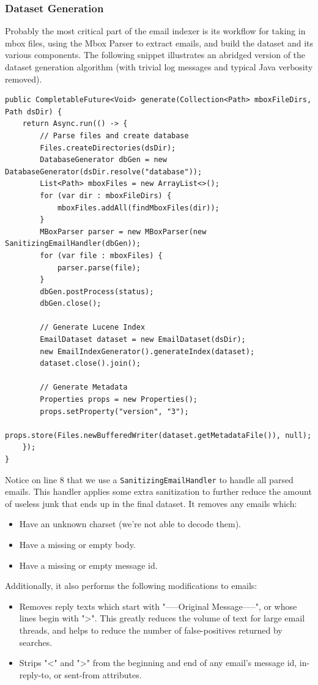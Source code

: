 \documentclass[a4paper, 12pt]{article}
\begin{document}
		\newpage %
		\subsubsection{Dataset Generation}
			Probably the most critical part of the email indexer is its workflow for taking in mbox files, using the Mbox Parser to extract emails, and build the dataset and its various components. The following snippet illustrates an abridged version of the dataset generation algorithm (with trivial log messages and typical Java verbosity removed).
			
			\begin{verbatim}
public CompletableFuture<Void> generate(Collection<Path> mboxFileDirs, Path dsDir) {
	return Async.run(() -> {
		// Parse files and create database
		Files.createDirectories(dsDir);
		DatabaseGenerator dbGen = new DatabaseGenerator(dsDir.resolve("database"));
		List<Path> mboxFiles = new ArrayList<>();
		for (var dir : mboxFileDirs) {
			mboxFiles.addAll(findMboxFiles(dir));
		}
		MBoxParser parser = new MBoxParser(new SanitizingEmailHandler(dbGen));
		for (var file : mboxFiles) {
			parser.parse(file);
		}
		dbGen.postProcess(status);
		dbGen.close();
		
		// Generate Lucene Index
		EmailDataset dataset = new EmailDataset(dsDir);
		new EmailIndexGenerator().generateIndex(dataset);
		dataset.close().join();
		
		// Generate Metadata
		Properties props = new Properties();
		props.setProperty("version", "3");
		props.store(Files.newBufferedWriter(dataset.getMetadataFile()), null);
	});
}
			\end{verbatim}
			
			Notice on line 8 that we use a \texttt{SanitizingEmailHandler} to handle all parsed emails. This handler applies some extra sanitization to further reduce the amount of useless junk that ends up in the final dataset. It removes any emails which:
			\begin{itemize}
				\item Have an unknown charset (we're not able to decode them).
				\item Have a missing or empty body.
				\item Have a missing or empty message id.
			\end{itemize}
			Additionally, it also performs the following modifications to emails:
			\begin{itemize}
				\item Removes reply texts which start with "-----Original Message-----", or whose lines begin with ">". This greatly reduces the volume of text for large email threads, and helps to reduce the number of false-positives returned by searches.
				\item Strips "<" and ">" from the beginning and end of any email's message id, in-reply-to, or sent-from attributes.
			\end{itemize}
		
\end{document}
